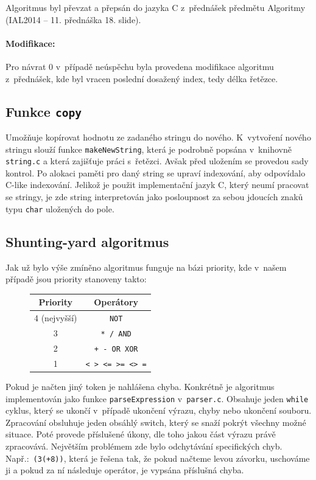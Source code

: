 \documentclass[12pt,a4paper,titlepage,final]{article}
\begin{document}
Algoritmus byl převzat a přepsán do jazyka C z~přednášek předmětu Algoritmy (IAL2014
\cite{honzik2} -- 11. přednáška 18. slide).
 
\paragraph{Modifikace:} Pro návrat 0 v~případě neúspěchu byla provedena modifikace
algoritmu z~přednášek, kde byl vracen poslední dosažený index, tedy délka řetězce.

\subsection{Funkce \texttt{copy}}
Umožňuje kopírovat hodnotu ze zadaného stringu do nového. K~vytvoření nového stringu slouží funkce \verb|makeNewString|, která je podrobně popsána v~knihovně \verb|string.c| a která zajišťuje práci s~řetězci. Avšak před uložením se provedou sady kontrol. %
Po alokaci paměti pro daný string se upraví indexování, aby odpovídalo C-like indexování. Jelikož je použit implementační jazyk C, který neumí pracovat se stringy, je zde string interpretován jako posloupnost za sebou jdoucích znaků typu \verb|char| uložených do pole.

\subsection{Shunting-yard algoritmus}\label{sya_popis}
Jak už bylo výše zmíněno algoritmus funguje na bázi priority, kde v~našem případě jsou priority stanoveny takto:

\begin{figure}[h!]
\centering
\begin{tabular}{| c | c |}
	\hline
	\textbf{Priority} & \textbf{Operátory} \\ \hline \hline
    4 (nejvyšší) & \texttt{NOT}  \\ \hline
    3 & \texttt{* / AND} \\ \hline
    2 & \texttt{+ - OR XOR}  \\ \hline
    1 & \texttt{< > <= >= <> =}  \\ \hline
\end{tabular}
\end{figure}

Pokud je načten jiný token je nahlášena chyba. Konkrétně je algoritmus implementován jako funkce \verb|parseExpression| v~\verb|parser.c|. Obsahuje jeden \verb|while| cyklus, který se ukončí v~případě ukončení výrazu, chyby nebo ukončení souboru. Zpracování obsluhuje jeden obsáhlý switch, který se snaží pokrýt všechny možné situace. Poté provede příslušené úkony, dle toho jakou část výrazu právě zpracovává. Největším problémem zde bylo odchytávání specifických chyb. Např.:~\verb|(3(+8))|, která je řešena tak, že pokud načteme levou závorku, uschováme ji a pokud za ní následuje operátor, je vypsána příslušná chyba.
\end{document}
